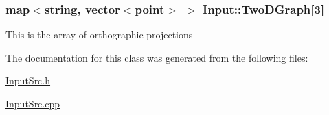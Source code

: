 \subsubsection[{\texorpdfstring{Two\+D\+Graph}{TwoDGraph}}]{\setlength{\rightskip}{0pt plus 5cm}map$<$string, vector$<${\bf point}$>$ $>$ Input\+::\+Two\+D\+Graph\mbox{[}3\mbox{]}}\hypertarget{classInput_a55526617adbcb0db4b3d565f4dbe772d}{}\label{classInput_a55526617adbcb0db4b3d565f4dbe772d}
This is the array of orthographic projections 

The documentation for this class was generated from the following files\+:\begin{DoxyCompactItemize}
\item 
\hyperlink{InputSrc_8h}{Input\+Src.\+h}\item 
\hyperlink{InputSrc_8cpp}{Input\+Src.\+cpp}\end{DoxyCompactItemize}
